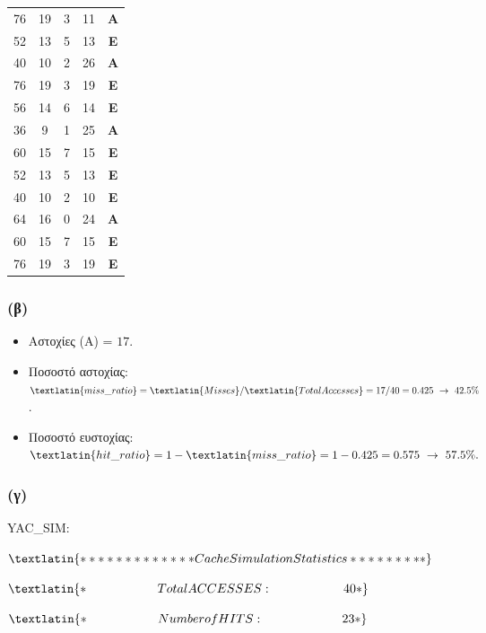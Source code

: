 \documentclass{article}
\begin{document}
\begin{table}[h]
\begin{tabular}{c|c|c|c|c}
76 & 19 & 3 & 11 & \textbf{Α} \\
52 & 13 & 5 & 13 & \textbf{Ε} \\
40 & 10 & 2 & 26 & \textbf{Α} \\
76 & 19 & 3 & 19 & \textbf{Ε} \\
56 & 14 & 6 & 14 & \textbf{Ε} \\
36 & 9 & 1 & 25 & \textbf{Α} \\
60 & 15 & 7 & 15 & \textbf{Ε} \\
52 & 13 & 5 & 13 & \textbf{Ε} \\
40 & 10 & 2 & 10 & \textbf{Ε} \\
64 & 16 & 0 & 24 & \textbf{Α} \\
60 & 15 & 7 & 15 & \textbf{Ε} \\
76 & 19 & 3 & 19 & \textbf{Ε} \\
\end{tabular}
\end{table}

\subsubsection*{\textbf{(β)}}

\begin{itemize}
    \item {Αστοχίες} (Α) = \( 17 \).
    \item {Ποσοστό αστοχίας}: $\textlatin{miss\_ratio} = {\textlatin{Misses}}/{\textlatin{Total Accesses}} = {17}/{40} = 0.425 \ \rightarrow \ 42.5\%$.
    \item {Ποσοστό ευστοχίας}: $\textlatin{hit\_ratio} = 1 - \textlatin{miss\_ratio} = 1 - 0.425 = 0.575 \ \rightarrow \ 57.5\%.$
\end{itemize}

\subsubsection*{\textbf{(γ)}}

\textlatin{YAC\_SIM:}

$
\textlatin
{
************* Cache Simulation Statistics *********
}
$

$
\textlatin
{
* \hspace{2cm}            Total ACCESSES :  \hspace{2cm}               40 *
}
$

$
\textlatin
{
*     \hspace{2cm}        Number of HITS :        \hspace{2.2cm}         23 *
}
$
\end{document}
